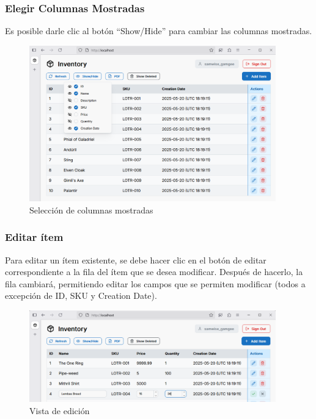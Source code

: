 \subsubsection{Elegir Columnas Mostradas}

Es posible darle clic al botón “Show/Hide” para cambiar las columnas mostradas.

\begin{figure}[H]
    \centering
    \includegraphics[width=0.95\textwidth]{images/12 Campos Mostrados}
    \caption{Selección de columnas mostradas}
\end{figure}

\subsubsection{Editar ítem}

Para editar un ítem existente, se debe hacer clic en el botón de editar correspondiente a la fila del ítem que se desea modificar. Después de hacerlo, la fila cambiará, permitiendo editar los campos que se permiten modificar (todos a excepción de ID, SKU y Creation Date).

\begin{figure}[H]
    \centering
    \includegraphics[width=0.95\textwidth]{images/13 Editar}
    \caption{Vista de edición}
\end{figure}

